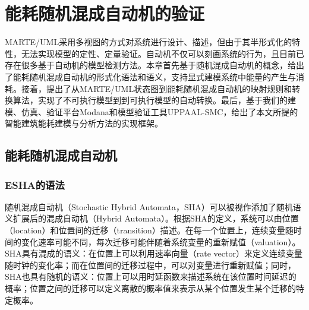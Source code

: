 \chapter{能耗随机混成自动机的验证}
\label{ch4}
\vspace{-0.7cm}
	MARTE/UML采用多视图的方式对系统进行设计、描述，但由于其半形式化的特性，无法实现模型的定性、定量验证。自动机不仅可以刻画系统的行为，且目前已存在很多基于自动机的模型检测方法。本章首先基于随机混成自动机的概念，给出了能耗随机混成自动机的形式化语法和语义，支持显式建模系统中能量的产生与消耗。接着，提出了从MARTE/UML状态图到能耗随机混成自动机的映射规则和转换算法，实现了不可执行模型到到可执行模型的自动转换。最后，基于我们的建模、仿真、验证平台Modana\citep{DBLP:conf/compsac/ChengWLD15,杜德慧2017一种面向}和模型验证工具UPPAAL-SMC\citep{DBLP:journals/spe/BehrmannDLPY11,DBLP:journals/corr/abs-1207-1272}，给出了本文所提的智能建筑能耗建模与分析方法的实现框架。
	
\section{能耗随机混成自动机}
\subsection{ESHA的语法}
	随机混成自动机（Stochastic Hybrid Automata，SHA）\citep{Hu2000Towards,David2011Statistical,程贝2016基于抽象和学习的统计模型检测研究}可以被视作添加了随机语义扩展后的混成自动机（Hybrid Automata）\citep{Henzinger1996The}。根据SHA的定义，系统可以由位置（location）和位置间的迁移（transition）描述。在每一个位置上，连续变量随时间的变化速率可能不同，每次迁移可能伴随着系统变量的重新赋值（valuation）。SHA具有混成的语义：在位置上可以利用速率向量（rate vector）来定义连续变量随时钟的变化率；而在位置间的迁移过程中，可以对变量进行重新赋值；同时，SHA也具有随机的语义：位置上可以用时延函数来描述系统在该位置时间延迟的概率；位置之间的迁移可以定义离散的概率值来表示从某个位置发生某个迁移的特定概率。
	
